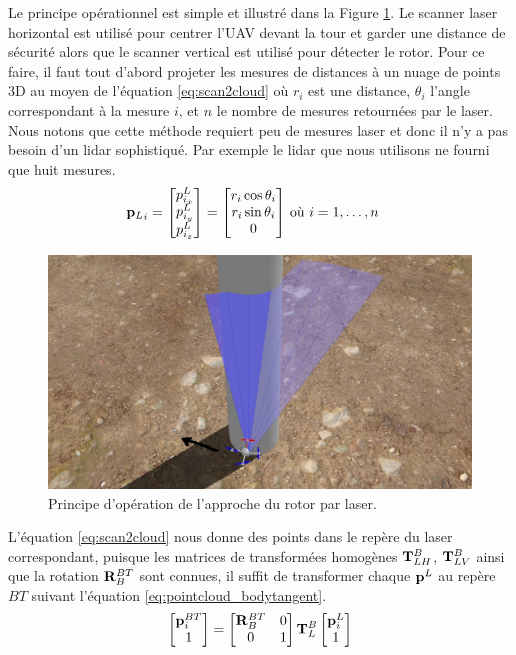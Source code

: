Le principe opérationnel est simple et illustré dans la Figure \ref{fig:approach}. Le scanner laser horizontal est utilisé pour centrer l'UAV devant la tour et garder une distance de sécurité alors que le scanner vertical est utilisé pour détecter le rotor. Pour ce faire, il faut tout d'abord projeter les mesures de distances à un nuage de points 3D au moyen de l'équation \ref{eq:scan2cloud} où $r_i$ est une distance, $\theta_i$ l'angle correspondant à la mesure $i$, et $n$ le nombre de mesures retournées par le laser. Nous notons que cette méthode requiert peu de mesures laser et donc il n'y a pas besoin d'un lidar sophistiqué. Par exemple le lidar que nous utilisons ne fourni que huit mesures.
\begin{align}
  {\mathbf{p}_{L}}_i = \begin{bmatrix}
    p^L_{i_x} \\
    p^L_{i_y} \\
    p^L_{i_z}
  \end{bmatrix} = \begin{bmatrix}r_i \cos \theta_i \\ r_i \sin \theta_i \\ 0 \end{bmatrix} & \text{ où } i=1,\ldots,n
    \label{eq:scan2cloud}
\end{align}
\begin{figure}[htp]
  \centering
  \includegraphics[width=0.8\linewidth]{images/principe_operation.jpg}
  \caption{Principe d'opération de l'approche du rotor par laser.}
  \label{fig:approach}
\end{figure}
L'équation \ref{eq:scan2cloud} nous donne des points dans le repère du laser correspondant, puisque les matrices de transformées homogènes $\mathbf{T}_{LH}^B$, $\mathbf{T}_{LV}^B$ ainsi que la rotation $\mathbf{R}_B^{BT}$ sont connues, il suffit de transformer chaque $\mathbf{p}^L$ au repère ${BT}$ suivant l'équation \ref{eq:pointcloud_bodytangent}.
\begin{align}
  \begin{bmatrix}\mathbf{p}^{BT}_i \\ 1\end{bmatrix} = \begin{bmatrix}
    \mathbf{R}_B^{BT} & 0 \\
    0 & 1
  \end{bmatrix} \mathbf{T}_{L}^B\begin{bmatrix}\mathbf{p}^{L}_i \\ 1\end{bmatrix}
  \label{eq:pointcloud_bodytangent}
\end{align}

